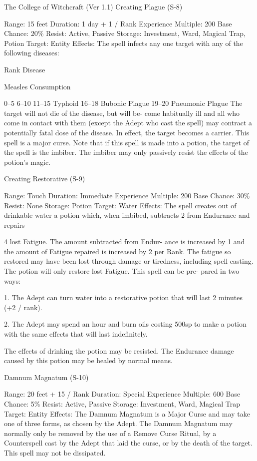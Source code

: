 \begin{Chapter}{The College of Witchcraft (Ver 1.1)}
Creating Plague (S-8) 

Range: 15 feet 
Duration: 1 day + 1 / Rank 
Experience Multiple: 200 
Base Chance: 20\% 
Resist: Active, Passive 
Storage: Investment, Ward, Magical Trap, Potion 
Target: Entity 
Effects: The spell infects any one target with any of 
the following diseases: 

Rank  Disease 

Measles 
Consumption 

0–5 
6–10 
11–15  Typhoid 
16–18  Bubonic Plague 
19–20  Pneumonic Plague 
The  target  will  not  die  of  the  disease,  but  will  be-
come  habitually  ill  and  all  who  come  in  contact 
with  them  (except  the  Adept  who  cast  the  spell) 
may contract a potentially fatal dose of the disease. 
In effect, the target becomes a carrier. This spell is 
a major curse. Note that if this spell is made into a 
potion,  the  target  of  the  spell  is  the  imbiber.  The 
imbiber may only passively resist the effects of the 
potion’s magic. 

Creating Restorative (S-9) 

Range: Touch 
Duration: Immediate 
Experience Multiple: 200 
Base Chance: 30\% 
Resist: None 
Storage: Potion 
Target: Water 
Effects:  The  spell  creates  out  of  drinkable  water  a 
potion  which,  when  imbibed,  subtracts  2  from 
Endurance and repairs 

4 lost Fatigue. The amount subtracted from Endur-
ance  is  increased  by  1  and  the  amount  of  Fatigue 
repaired is increased by 2 per Rank. The fatigue so 
restored  may  have  been  lost  through  damage  or 
tiredness,  including  spell  casting.  The  potion  will 
only  restore  lost  Fatigue.  This  spell  can  be  pre-
pared in two ways: 

1.  The  Adept  can  turn  water  into  a  restorative 
potion that will last 2 minutes (+2 / rank). 

2.  The  Adept  may  spend  an  hour  and  burn  oils 
costing  500sp  to  make  a  potion  with  the  same 
effects that will last indefinitely. 

The effects of drinking the potion may be resisted. 
The Endurance damage caused by this potion may 
be healed by normal means. 

Damnum Magnatum (S-10) 

Range: 20 feet + 15 / Rank 
Duration: Special 
Experience Multiple: 600 
Base Chance: 5\% 
Resist: Active, Passive 
Storage: Investment, Ward, Magical Trap 
Target: Entity 
Effects: The Damnum Magnatum is a Major Curse 
and may take one of three forms, as chosen by the 
Adept.  The  Damnum  Magnatum  may  normally 
only  be  removed  by  the  use  of  a  Remove  Curse 
Ritual,  by  a  Counterspell  cast  by  the  Adept  that 
laid  the  curse,  or  by  the  death  of  the  target.  This 
spell may not be dissipated. 


\end{Chapter}
